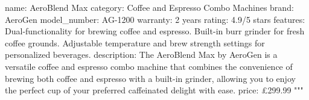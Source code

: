 \documentclass[
  letterpaper,
  DIV=11,
  numbers=noendperiod]{scrreprt}
\newenvironment{Shaded}{\begin{snugshade}}{\end{snugshade}}
\newcommand{\StringTok}[1]{\textcolor[rgb]{0.13,0.47,0.30}{#1}}
\begin{document}
\begin{Shaded}
\begin{Highlighting}[]
\StringTok{name: AeroBlend Max}
\StringTok{category: Coffee and Espresso Combo Machines}
\StringTok{brand: AeroGen}
\StringTok{model\_number: AG{-}1200}
\StringTok{warranty: 2 years}
\StringTok{rating: 4.9/5 stars}
\StringTok{features:}
\StringTok{  Dual{-}functionality for brewing coffee and espresso.}
\StringTok{  Built{-}in burr grinder for fresh coffee grounds.}
\StringTok{  Adjustable temperature and brew strength settings for personalized beverages.}
\StringTok{description: The AeroBlend Max by AeroGen is a versatile coffee and espresso combo machine that combines the convenience of brewing both coffee and espresso with a built{-}in grinder,}
\StringTok{allowing you to enjoy the perfect cup of your preferred caffeinated delight with ease.}
\StringTok{price: £299.99}
\StringTok{"""}
\end{Highlighting}
\end{Shaded}
\end{document}
